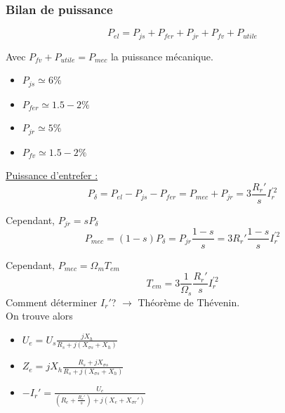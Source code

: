 \documentclass[../main.tex]{subfiles}
\begin{document}
\subsubsection{Bilan de puissance}

\begin{equation}
    P_{el} = P_{js} + P_{fer} + P_{jr} + P_{fv} + P_{utile}
\end{equation}

Avec $P_{fv}+P_{utile} = P_{mec}$ la puissance mécanique.\begin{itemize}
    \item $P_{js} \simeq 6\%$\\
    \item $P_{fer} \simeq 1.5-2\%$\\
    \item $P_{jr} \simeq 5\%$\\
    \item $P_{fv} \simeq 1.5-2\%$\\
\end{itemize}

\quad \underline{Puissance d'entrefer :}\\
\begin{equation}
    P_\delta = P_{el} - P_{js}-P_{fer} = P_{mec} + P_{jr} = 3\frac{R_r'}{s}I_r^{'2}
\end{equation}

Cependant, $P_{jr} = sP_\delta$\\

\begin{equation}
    P_{mec} = (1-s)P_\delta = P_{jr} \frac{1-s}{s} = 3R_r' \frac{1-s}{s}I_r^{'2}
\end{equation}

Cependant, $P_{mec} = \Omega_m T_{em}$\\

\begin{equation}
    T_{em} = 3 \frac{1}{\Omega_s} \frac{R_r'}{s} I_r^{'2}
\end{equation}
Comment déterminer $I_r'$? $\rightarrow$ Théorème de Thévenin.\\

On trouve alors \begin{itemize}
    \item $U_e = U_s \frac{jX_h}{R_s + j(X_{\sigma s} + X_h)}$\\
    \item $Z_e = jX_h \frac{R_s + jX_{\sigma s}}{R_s + j(X_{\sigma s} + X_h)}$\\
    \item $-I_r' = \frac{U_e}{(R_e + \frac{R_r'}{s}) + j(X_e + X_{\sigma r}')}$\\
\end{itemize}
\end{document}
